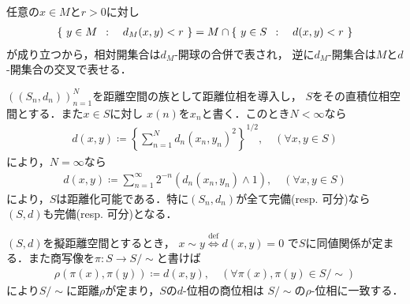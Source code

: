 	\begin{prf} 任意の$x \in M$と$r > 0$に対し
		\begin{align}
			\left\{\ y \in M\ \, : \quad d_M(x,y) < r\ \right\}
			= M \cap \left\{\ y \in S\ \, : \quad d(x,y) < r\ \right\}
		\end{align}
		が成り立つから，相対開集合は$d_M$-開球の合併で表され，
		逆に$d_M$-開集合は$M$と$d$-開集合の交叉で表せる．
		\QED
	\end{prf}
	
	\begin{screen}
		\begin{thm}[距離空間の高々可算直積の距離]
			$((S_n,d_n))_{n=1}^N$を距離空間の族として距離位相を導入し，
			$S$をその直積位相空間とする．また$x \in S$に対し
			$x(n)$を$x_n$と書く．このとき$N < \infty$なら
			\begin{align}
				d(x,y)
				\coloneqq \left\{\sum_{n=1}^N d_n(x_n,y_n)^2\right\}^{1/2},
				\quad (\forall x,y \in S)
			\end{align}
			により，$N = \infty$なら
			\begin{align}
				d(x,y) \coloneqq
				\sum_{n=1}^\infty 2^{-n}\left(d_n(x_n,y_n) \wedge 1\right),
				\quad (\forall x,y \in S)
			\end{align}
			により，$S$は距離化可能である．特に$(S_n,d_n)$が全て完備(resp. 可分)なら
			$(S,d)$も完備(resp. 可分)となる．
		\end{thm}
	\end{screen}
	
	\begin{screen}
		\begin{thm}[擬距離の距離化]
			$(S,d)$を擬距離空間とするとき，
			$x \sim y \overset{\mathrm{def}}{\Longleftrightarrow} d(x,y) = 0$
			で$S$に同値関係が定まる．また商写像を$\pi:S \longrightarrow S/\sim$と書けば
			\begin{align}
				\rho(\pi(x),\pi(y)) \coloneqq d(x,y),
				\quad (\forall \pi(x),\pi(y) \in S/\sim)
			\end{align}
			により$S/\sim$に距離$\rho$が定まり，$S$の$d$-位相の商位相は
			$S/\sim$の$\rho$-位相に一致する．
		\end{thm}
	\end{screen}
	
